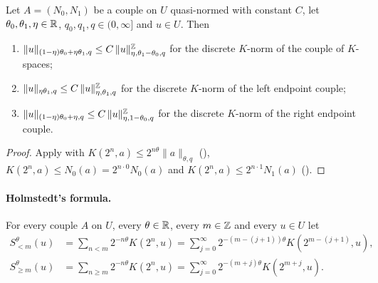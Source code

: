 \begin{corollary}
\label{cor:reiteration-easy}
\leanok
{}
Let $A = (N_0, N_1)$ be a couple on $U$ quasi-normed with constant $C$, let
$\theta_0, \theta_1, \eta \in \mathbb{R}$, $q_0, q_1, q \in (0, \infty]$ and $u \in U$. Then
\begin{enumerate}
  \item $\|u\|_{(1-\eta)\theta_0 + \eta\theta_1, q} \leq C \, \|u\|^{\mathbb{Z}}_{\eta, \theta_1 -
    \theta_0, q}$ for the discrete $K$-norm of the couple of $K$-spaces;
  \item $\|u\|_{\eta\theta_1, q} \leq C \, \|u\|^{\mathbb{Z}}_{\eta, \theta_1, q}$ for the discrete
    $K$-norm of the left endpoint couple;
  \item $\|u\|_{(1-\eta)\theta_0 + \eta, q} \leq C \, \|u\|^{\mathbb{Z}}_{\eta, 1 - \theta_0, q}$ for the
    discrete $K$-norm of the right endpoint couple.
\end{enumerate}
\end{corollary}

\begin{proof}
\leanok
Apply  with $K(2^n, a) \leq 2^{n\theta} \|a\|_{\theta, q}$
(), $K(2^n, a) \leq N_0(a) = 2^{n \cdot 0} N_0(a)$ and
$K(2^n, a) \leq 2^{n \cdot 1} N_1(a)$ ().
\end{proof}

\paragraph{Holmstedt's formula.}

\begin{definition}
\label{def:holmstedt-sums}
\leanok
{}
For every couple $A$ on $U$, every $\theta \in \mathbb{R}$, every $m \in \mathbb{Z}$ and every $u \in U$ let
\begin{align*}
  S^{\theta}_{<m}(u) &= \sum_{n < m} 2^{-n\theta} K(2^n, u)
  = \sum_{j=0}^\infty 2^{-(m-(j+1))\theta} K(2^{m-(j+1)}, u) , \\
  S^{\theta}_{\geq m}(u) &= \sum_{n \geq m} 2^{-n\theta} K(2^n, u)
  = \sum_{j=0}^\infty 2^{-(m+j)\theta} K(2^{m+j}, u) .
\end{align*}
\end{definition}


